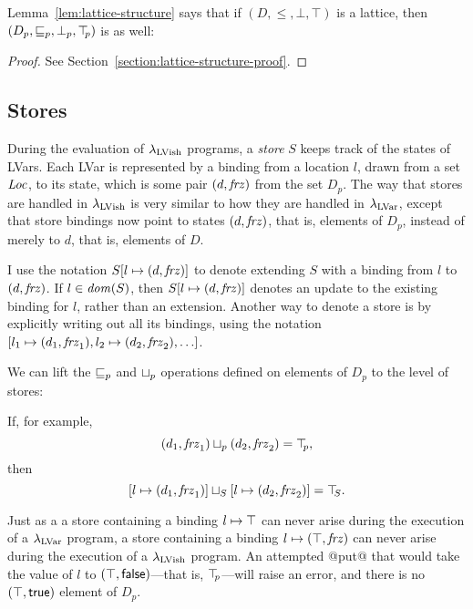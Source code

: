 \DefLatticeWithStatusBits

\LemPartitionOfDp

\DefLubP

Lemma~\ref{lem:lattice-structure} says that if $(D, \leq, \bot, \top)$
is a lattice, then $(D_p, \sqsubseteq_p, \bot_{p}, \top\hspace{-0.85mm}_{p})$ is as well:

\LemLatticeStructure
\begin{proof}
See Section~\ref{section:lattice-structure-proof}.
\end{proof}

\subsection{Stores}

During the evaluation of $\lambda_{\textrm{LVish}}$ programs, a \emph{store} $S$
keeps track of the states of LVars.  Each LVar is represented by a
binding from a location $l$, drawn from a set $\mathit{Loc}$, to its state,
which is some pair $(d, \mathit{frz})$ from the set $D_p$.  The way
that stores are handled in $\lambda_{\textrm{LVish}}$ is very similar to how they
are handled in $\lambda_{\textrm{LVar}}$, except that store bindings now point to
states $(d, \mathit{frz})$, that is, elements of $D_p$, instead of
merely to $d$, that is, elements of $D$.

\DefStore

I use the notation $S[l \mapsto (d, \mathit{frz})]$ to denote extending $S$
with a binding from $l$ to $(d, \mathit{frz})$.  If $l \in \mathit{dom}(S)$,
then $S[l \mapsto (d, \mathit{frz})]$ denotes an update to the existing
binding for $l$, rather than an extension.  Another way to denote a
store is by explicitly writing out all its bindings, using the
notation $\store{\storebinding{l_1}{d_1}{\status_1},
  \storebinding{l_2}{d_2}{\status_2}, \dots}$.

We can lift the $\sqsubseteq_p$ and $ \sqcup_p $ operations defined on elements
of $D_p$ to the level of stores:

\DefLeqStore

\DefLubStore

If, for example,
\[ (d_1, \mathit{frz}_1) \sqcup_p (d_2, \mathit{frz}_2) = \top\hspace{-0.85mm}_{p}, \]
then
\[ \left[ l \mapsto (d_1, \mathit{frz}_1) \right] \sqcup_{S} \left[ l \mapsto (d_2, \mathit{frz}_2) \right] =
\top\hspace{-0.85mm}_{S}. \]

Just as a a store containing a binding $l \mapsto \top$ can
never arise during the execution of a $\lambda_{\textrm{LVar}}$ program, a store
containing a binding $l \mapsto (\top, \mathit{frz})$ can never arise
during the execution of a $\lambda_{\textrm{LVish}}$ program. An attempted @put@
that would take the value of $l$ to
$(\top, \textsf{false})$---that is, $\top\hspace{-0.85mm}_{p}$---will raise an error,
and there is no $(\top, \textsf{true})$ element of $D_p$.

